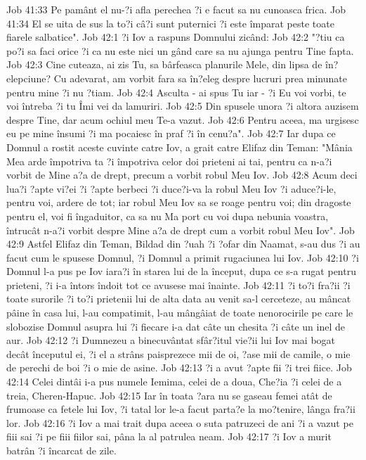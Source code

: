 Job 41:33  Pe pamânt el nu-?i afla perechea ?i e facut sa nu cunoasca frica.
Job 41:34  El se uita de sus la to?i câ?i sunt puternici ?i este împarat peste toate fiarele salbatice".
Job 42:1  ?i Iov a raspuns Domnului zicând:
Job 42:2  "?tiu ca po?i sa faci orice ?i ca nu este nici un gând care sa nu ajunga pentru Tine fapta.
Job 42:3  Cine cuteaza, ai zis Tu, sa bârfeasca planurile Mele, din lipsa de în?elepciune? Cu adevarat, am vorbit fara sa în?eleg despre lucruri prea minunate pentru mine ?i nu ?tiam.
Job 42:4  Asculta - ai spus Tu iar - ?i Eu voi vorbi, te voi întreba ?i tu Îmi vei da lamuriri.
Job 42:5  Din spusele unora ?i altora auzisem despre Tine, dar acum ochiul meu Te-a vazut.
Job 42:6  Pentru aceea, ma urgisesc eu pe mine însumi ?i ma pocaiesc în praf ?i în cenu?a".
Job 42:7  Iar dupa ce Domnul a rostit aceste cuvinte catre Iov, a grait catre Elifaz din Teman: "Mânia Mea arde împotriva ta ?i împotriva celor doi prieteni ai tai, pentru ca n-a?i vorbit de Mine a?a de drept, precum a vorbit robul Meu Iov.
Job 42:8  Acum deci lua?i ?apte vi?ei ?i ?apte berbeci ?i duce?i-va la robul Meu Iov ?i aduce?i-le, pentru voi, ardere de tot; iar robul Meu Iov sa se roage pentru voi; din dragoste pentru el, voi fi îngaduitor, ca sa nu Ma port cu voi dupa nebunia voastra, întrucât n-a?i vorbit despre Mine a?a de drept cum a vorbit robul Meu Iov".
Job 42:9  Astfel Elifaz din Teman, Bildad din ?uah ?i ?ofar din Naamat, s-au dus ?i au facut cum le spusese Domnul, ?i Domnul a primit rugaciunea lui Iov.
Job 42:10  ?i Domnul l-a pus pe Iov iara?i în starea lui de la început, dupa ce s-a rugat pentru prieteni, ?i i-a întors îndoit tot ce avusese mai înainte.
Job 42:11  ?i to?i fra?ii ?i toate surorile ?i to?i prietenii lui de alta data au venit sa-l cerceteze, au mâncat pâine în casa lui, l-au compatimit, l-au mângâiat de toate nenorocirile pe care le slobozise Domnul asupra lui ?i fiecare i-a dat câte un chesita ?i câte un inel de aur.
Job 42:12  ?i Dumnezeu a binecuvântat sfâr?itul vie?ii lui Iov mai bogat decât începutul ei, ?i el a strâns paisprezece mii de oi, ?ase mii de camile, o mie de perechi de boi ?i o mie de asine.
Job 42:13  ?i a avut ?apte fii ?i trei fiice.
Job 42:14  Celei dintâi i-a pus numele Iemima, celei de a doua, Che?ia ?i celei de a treia, Cheren-Hapuc.
Job 42:15  Iar în toata ?ara nu se gaseau femei atât de frumoase ca fetele lui Iov, ?i tatal lor le-a facut parta?e la mo?tenire, lânga fra?ii lor.
Job 42:16  ?i Iov a mai trait dupa aceea o suta patruzeci de ani ?i a vazut pe fiii sai ?i pe fiii fiilor sai, pâna la al patrulea neam.
Job 42:17  ?i Iov a murit batrân ?i încarcat de zile.


